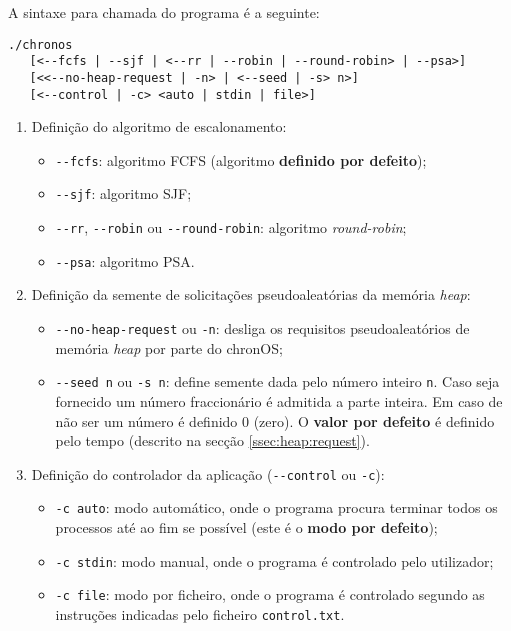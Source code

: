 \documentclass[10pt,oneside]{estiloUBI}
\newcommand{\chronOS}{\textsf{chronOS}}
\begin{document}
	A sintaxe para chamada do programa é a seguinte:
	
	\begin{verbatim}
./chronos
   [<--fcfs | --sjf | <--rr | --robin | --round-robin> | --psa>]
   [<<--no-heap-request | -n> | <--seed | -s> n>]
   [<--control | -c> <auto | stdin | file>]
	\end{verbatim}
	
	\begin{enumerate}
		\item Definição do algoritmo de escalonamento:
		\begin{itemize}
			\item \verb|--fcfs|: algoritmo \ac{FCFS} (algoritmo \textbf{definido por defeito});
			\item \verb|--sjf|: algoritmo \ac{SJF};
			\item \verb|--rr|, \verb|--robin| ou \verb|--round-robin|: algoritmo \textit{round-robin};
			\item \verb|--psa|: algoritmo \ac{PSA}.
		\end{itemize}
	
		\item Definição da semente de solicitações pseudoaleatórias da memória \textit{heap}:
		\begin{itemize}
			\item \verb|--no-heap-request| ou \verb|-n|: desliga os requisitos pseudoaleatórios de memória \textit{heap} por parte do \chronOS;
			\item \verb|--seed n| ou \verb|-s n|: define semente dada pelo número inteiro \verb|n|. Caso seja fornecido um número fraccionário é admitida a parte inteira. Em caso de não ser um número é definido 0 (zero). O \textbf{valor por defeito} é definido pelo tempo (descrito na secção \ref{ssec:heap:request}).
		\end{itemize}
	
		\item Definição do controlador da aplicação (\verb|--control| ou \verb|-c|):
		\begin{itemize}
			\item \verb|-c auto|: modo automático, onde o programa procura terminar todos os processos até ao fim se possível (este é o \textbf{modo por defeito});
			\item \verb|-c stdin|: modo manual, onde o programa é controlado pelo utilizador;
			\item \verb|-c file|: modo por ficheiro, onde o programa é controlado segundo as instruções indicadas pelo ficheiro \verb|control.txt|.
		\end{itemize}
	\end{enumerate}
	
\end{document}
